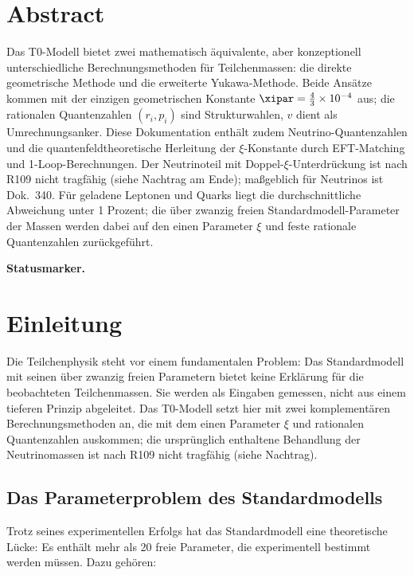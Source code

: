 

\section*{Abstract}
Das T0-Modell bietet zwei mathematisch äquivalente, aber konzeptionell unterschiedliche Berechnungsmethoden für Teilchenmassen: die direkte geometrische Methode und die erweiterte Yukawa-Methode. Beide Ansätze kommen mit der einzigen geometrischen Konstante $\xipar = \frac{4}{3} \times 10^{-4}$ aus; die rationalen Quantenzahlen $(r_i, p_i)$ sind Strukturwahlen, $v$ dient als Umrechnungsanker. Diese Dokumentation enthält zudem Neutrino-Quantenzahlen und die quantenfeldtheoretische Herleitung der $\xi$-Konstante durch EFT-Matching und 1-Loop-Berechnungen. Der Neutrinoteil mit Doppel-$\xi$-Unterdrückung ist nach R109 nicht tragfähig (siehe Nachtrag am Ende); maßgeblich für Neutrinos ist Dok.~340. Für geladene Leptonen und Quarks liegt die durchschnittliche Abweichung unter 1 Prozent; die über zwanzig freien Standardmodell-Parameter der Massen werden dabei auf den einen Parameter $\xi$ und feste rationale Quantenzahlen zurückgeführt.


\medskip\noindent\textbf{Statusmarker.}


\section{Einleitung}
\label{sec:introduction}

Die Teilchenphysik steht vor einem fundamentalen Problem: Das Standardmodell mit seinen über zwanzig freien Parametern bietet keine Erklärung für die beobachteten Teilchenmassen. Sie werden als Eingaben gemessen, nicht aus einem tieferen Prinzip abgeleitet. Das T0-Modell setzt hier mit zwei komplementären Berechnungsmethoden an, die mit dem einen Parameter $\xi$ und rationalen Quantenzahlen auskommen; die ursprünglich enthaltene Behandlung der Neutrinomassen ist nach R109 nicht tragfähig (siehe Nachtrag).

\subsection{Das Parameterproblem des Standardmodells}
\label{subsec:parameter_problem}

Trotz seines experimentellen Erfolgs hat das Standardmodell eine theoretische Lücke: Es enthält mehr als 20 freie Parameter, die experimentell bestimmt werden müssen. Dazu gehören:

